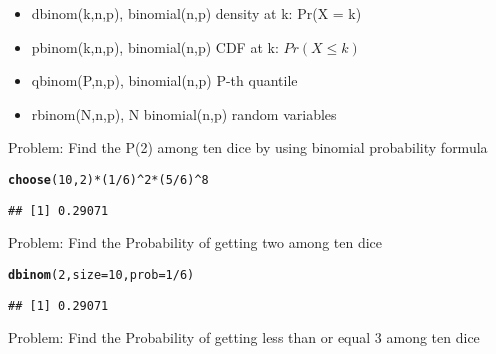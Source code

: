\documentclass{article}\usepackage[]{graphicx}\usepackage[]{xcolor}
\makeatletter
\newcommand{\hlnum}[1]{\textcolor[rgb]{0.686,0.059,0.569}{#1}}%
\newcommand{\hlopt}[1]{\textcolor[rgb]{0,0,0}{#1}}%
\newcommand{\hldef}[1]{\textcolor[rgb]{0.345,0.345,0.345}{#1}}%
\newcommand{\hlkwc}[1]{\textcolor[rgb]{0.333,0.667,0.333}{#1}}%
\newcommand{\hlkwd}[1]{\textcolor[rgb]{0.737,0.353,0.396}{\textbf{#1}}}%
\newenvironment{kframe}{%
 \def\at@end@of@kframe{}%
 \ifinner\ifhmode%
  \def\at@end@of@kframe{\end{minipage}}%
  \begin{minipage}{\columnwidth}%
 \fi\fi%
 \def\FrameCommand##1{\hskip\@totalleftmargin \hskip-\fboxsep
 \colorbox{shadecolor}{##1}\hskip-\fboxsep
     \hskip-\linewidth \hskip-\@totalleftmargin \hskip\columnwidth}%
 \MakeFramed {\advance\hsize-\width
   \@totalleftmargin\z@ \linewidth\hsize
   \@setminipage}}%
 {\par\unskip\endMakeFramed%
 \at@end@of@kframe}
\newenvironment{knitrout}{}{} %
\makeatother
\begin{document}
	\begin{itemize}
		\item dbinom(k,n,p),  binomial(n,p) density at k: Pr(X = k)
		\item pbinom(k,n,p),  binomial(n,p) CDF at k: $Pr(X \leq k)$
		\item qbinom(P,n,p),  binomial(n,p) P-th quantile
		\item rbinom(N,n,p),  N binomial(n,p) random variables
	\end{itemize} 


Problem: \newline
Find the P(2) among ten dice by using binomial probability formula
\begin{knitrout}
\color{fgcolor}\begin{kframe}
\begin{alltt}
\hlkwd{choose}\hldef{(}\hlnum{10}\hldef{,}\hlnum{2}\hldef{)}\hlopt{*}\hldef{(}\hlnum{1}\hlopt{/}\hlnum{6}\hldef{)}\hlopt{^}\hlnum{2}\hlopt{*}\hldef{(}\hlnum{5}\hlopt{/}\hlnum{6}\hldef{)}\hlopt{^}\hlnum{8}
\end{alltt}
\begin{verbatim}
## [1] 0.29071
\end{verbatim}
\end{kframe}
\end{knitrout}
Problem: \newline
Find the Probability of getting two among ten dice
\begin{knitrout}
\color{fgcolor}\begin{kframe}
\begin{alltt}
\hlkwd{dbinom}\hldef{(}\hlnum{2}\hldef{,}\hlkwc{size}\hldef{=}\hlnum{10}\hldef{,}\hlkwc{prob}\hldef{=}\hlnum{1}\hlopt{/}\hlnum{6}\hldef{)}
\end{alltt}
\begin{verbatim}
## [1] 0.29071
\end{verbatim}
\end{kframe}
\end{knitrout}
Problem: \newline
Find the Probability of getting less than or equal 3 among ten dice
\end{document}
